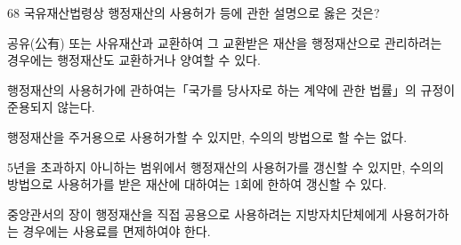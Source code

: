 \begin{question}{68}
국유재산법령상 행정재산의 사용허가 등에 관한 설명으로 옳은 것은?
\begin{choices}
  \item 공유(公有) 또는 사유재산과 교환하여 그 교환받은 재산을 행정재산으로 관리하려는 경우에는 행정재산도 교환하거나 양여할 수 있다.
  \item 행정재산의 사용허가에 관하여는「국가를 당사자로 하는 계약에 관한 법률」의 규정이 준용되지 않는다.
  \item 행정재산을 주거용으로 사용허가할 수 있지만, 수의의 방법으로 할 수는 없다.
  \item 5년을 초과하지 아니하는 범위에서 행정재산의 사용허가를 갱신할 수 있지만, 수의의 방법으로 사용허가를 받은 재산에 대하여는 1회에 한하여 갱신할 수 있다.
  \item 중앙관서의 장이 행정재산을 직접 공용으로 사용하려는 지방자치단체에게 사용허가하는 경우에는 사용료를 면제하여야 한다.
\end{choices}
\end{question}
\answerall
{}
